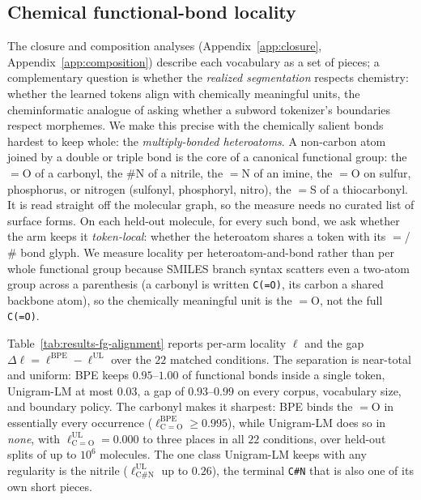 \documentclass{article}
\begin{document}
\subsection{Chemical functional-bond locality}\label{app:fg-alignment}

The closure and composition analyses (Appendix~\ref{app:closure}, Appendix~\ref{app:composition})
describe each vocabulary as a set of pieces; a complementary question is whether
the \emph{realized segmentation} respects chemistry: whether the learned
tokens align with chemically meaningful units, the cheminformatic analogue of
asking whether a subword tokenizer's boundaries respect morphemes. We make this
precise with the chemically salient bonds hardest to keep whole: the
\emph{multiply-bonded heteroatoms}. A non-carbon atom joined by a double or
triple bond is the core of a canonical functional group: the $=$O of a carbonyl,
the $\#$N of a nitrile, the $=$N of an imine, the $=$O on sulfur, phosphorus, or
nitrogen (sulfonyl, phosphoryl, nitro), the $=$S of a thiocarbonyl. It is read
straight off the molecular graph, so the measure needs no curated list
of surface forms. On each held-out molecule, for every such bond, we ask whether
the arm keeps it \emph{token-local}: whether the heteroatom shares a token with
its $=$/$\#$ bond glyph. We measure locality per heteroatom-and-bond rather than
per whole functional group because SMILES branch syntax scatters even a two-atom
group across a parenthesis (a carbonyl is written \texttt{C(=O)}, its carbon a
shared backbone atom), so the chemically meaningful unit is the $=$O, not the
full \texttt{C(=O)}.



Table~\ref{tab:results-fg-alignment} reports per-arm locality $\ell$ and the gap
$\Delta\ell=\ell^{\mathrm{BPE}}-\ell^{\mathrm{UL}}$ over the $22$ matched conditions.
The separation is near-total and uniform: BPE keeps $0.95$--$1.00$ of functional
bonds inside a single token, Unigram-LM at most $0.03$, a gap of $0.93$--$0.99$ on
every corpus, vocabulary size, and boundary policy. The carbonyl makes it
sharpest: BPE binds the $=$O in essentially every occurrence
($\ell^{\mathrm{BPE}}_{\mathrm{C=O}}\ge 0.995$), while Unigram-LM does so in
\emph{none}, with $\ell^{\mathrm{UL}}_{\mathrm{C=O}}=0.000$ to three places in all
$22$ conditions, over held-out splits of up to $10^6$ molecules. The one class
Unigram-LM keeps with any regularity is the nitrile
($\ell^{\mathrm{UL}}_{\mathrm{C\#N}}$ up to $0.26$), the terminal \texttt{C\#N}
that is also one of its own short pieces.
\end{document}

